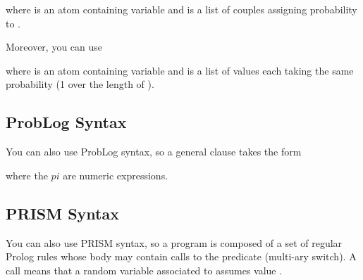 \documentclass[letterpaper,10pt,english]{sphinxmanual}
\begin{document}
\begin{sphinxVerbatim}[commandchars=\\\{\}]
\end{sphinxVerbatim}

where  is an atom containing variable  and  is a list of couples  assigning probability  to .

Moreover, you can use

\begin{sphinxVerbatim}[commandchars=\\\{\}]
\end{sphinxVerbatim}

where  is an atom containing variable  and  is a list of values each taking the same probability (1 over the length of ).


\subsection{ProbLog Syntax}
\label{\detokenize{index:problog-syntax}}
You can also use ProbLog  syntax, so a general clause takes the form

\begin{sphinxVerbatim}[commandchars=\\\{\}]
      
\end{sphinxVerbatim}

where the \(pi\) are numeric expressions.


\subsection{PRISM Syntax}
\label{\detokenize{index:prism-syntax}}
You can also use PRISM  syntax, so a program is composed of a set of regular Prolog rules whose body may contain calls to the  predicate (multi-ary switch).
A call  means that a random variable associated to  assumes value .
\end{document}
